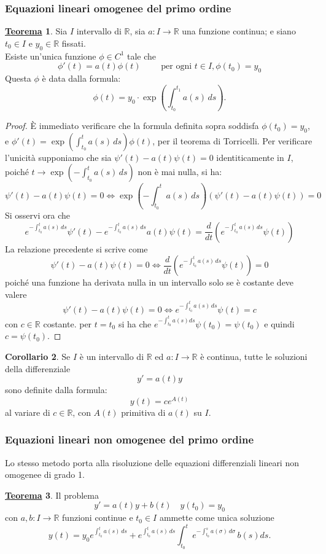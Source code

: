 \documentclass[a4paper,twoside]{article}
\newcommand{\R}{\mathbb{R}}
\theoremstyle{definition}
\newtheorem{theorem}{\color{Red}\underline{\textrm Teorema}}
\newtheorem{cor}[theorem]{Corollario}
\numberwithin{theorem}{section}
\begin{document}
\subsubsection{Equazioni lineari omogenee del primo ordine}
\begin{theorem}
    Sia $I$ intervallo di $\R$, sia $a:I \to \R$ una funzione continua; e siano $t_0\in I$ e $y_0\in\R$ fissati.\\ Esiste un'unica funzione $\phi\in C^1$ tale che 
    $$\phi'(t)=a(t)\phi(t)\qquad \text{ per ogni } t\in I,\phi(t_0)=y_0$$
    Questa $\phi$ è data dalla formula: 
    $$\phi(t) =y_0\cdot \exp\left(\int_{t_0}^{t_1}a(s)\,ds\right).$$
\end{theorem}
\begin{proof}
    È immediato verificare che la formula definita sopra soddisfa $\phi(t_0)=y_0$, e $\phi'(t)=\exp\left(\int_{t_0}^{t}a(s)\, ds\right)\phi(t)$, per il teorema di Torricelli. Per verificare l'unicità supponiamo che sia $\psi'(t)-a(t)\psi(t)=0$ identiticamente in $I$, poiché $t\to \exp\left(-\int_{t_0}^{t}a(s)\, ds\right)$ non è mai nulla, si ha:
    $$\psi'(t)-a(t)\psi(t)=0\Leftrightarrow \exp\left(-\int_{t_0}^{t}a(s)\, ds\right)(\psi'(t)-a(t)\psi(t))=0$$
    Si osservi ora che
    $$e^{-\int_{t_0}^{t}a(s)\, ds}\psi'(t)-e^{-\int_{t_0}^{t}a(s)\, ds}a(t)\psi(t)=\frac{d}{dt}\left(e^{-\int_{t_0}^{t}a(s)\, ds}\psi(t)\right)$$
    La relazione precedente si scrive come
    $$\psi'(t)-a(t)\psi(t)=0\Leftrightarrow \frac{d}{dt}\left(e^{-\int_{t_0}^{t}a(s)\, ds}\psi(t)\right)=0$$
    poiché una funzione ha derivata nulla in un intervallo solo se è costante deve valere
    $$\psi'(t)-a(t)\psi(t)=0\Leftrightarrow e^{-\int_{t_0}^{t}a(s)\, ds}\psi(t)=c$$
    con $c\in\R$ costante. per $t=t_0$ si ha che $e^{-\int_{t_0}^{t}a(s)ds}\psi(t_0)=\psi(t_0)$ e quindi $c=\psi(t_0)$.
\end{proof}
\begin{cor}
    Se $I$ è un intervallo di $\R$ ed $a:I\to\R$ è continua, tutte le soluzioni della differenziale $$y'=a(t)y$$
    sono definite dalla formula:
    $$y(t)=ce^{A(t)}$$
    al variare di $c\in\R$, con $A(t)$ primitiva di $a(t)$ su $I$.
\end{cor}


\subsubsection{Equazioni lineari non omogenee del primo ordine}
Lo stesso metodo porta alla risoluzione delle equazioni differenziali lineari non omogenee di grado 1.
\begin{theorem}
    Il problema
    $$y'=a(t)y+b(t)\quad y(t_0)=y_0$$
    con $a,b:I\to\R$ funzioni continue e $t_0\in I$ ammette come unica soluzione
    $$y(t)=y_0e^{\int_{t_0}^{t}a(s)\, ds}+ e^{\int_{t_0}^{t}a(s)\, ds}\int_{t_0}^{t}e^{-\int_{t_0}^{s}a(\sigma)\, d\sigma}\,b(s) ds.$$ 
\end{theorem}
\end{document}
